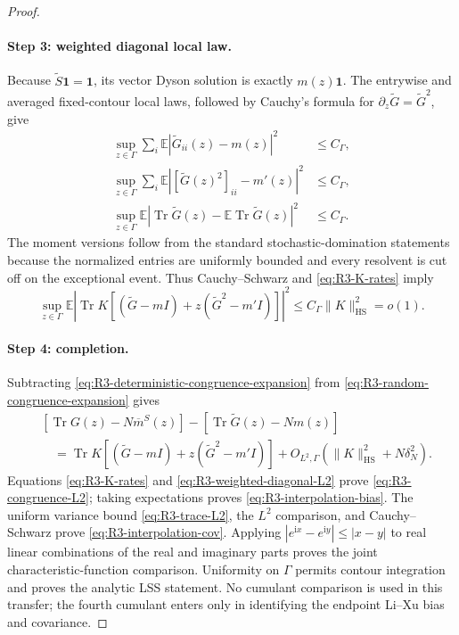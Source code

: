 \documentclass[11pt]{article}
\theoremstyle{definition}
\theoremstyle{remark}
\newcommand{\E}{\mathbb E}
\newcommand{\Tr}{\operatorname{Tr}}
\newcommand{\ii}{\mathrm i}
\newcommand{\HS}{\mathrm{HS}}
\newcommand{\one}{\mathbf 1}
\newcommand{\norm}[1]{\lVert #1\rVert}
\begin{document}
\begin{proof}
\paragraph{Step 3: weighted diagonal local law.}
Because \(\widetilde S\one=\one\), its vector Dyson solution is exactly
\(m(z)\one\).  The entrywise and averaged fixed-contour local laws, followed
by Cauchy's formula for \(\partial_z\widetilde G=\widetilde G^2\), give
\begin{align}
 \sup_{z\in\Gamma}\sum_i
 \E|\widetilde G_{ii}(z)-m(z)|^2&\le C_\Gamma,
 \label{eq:R3-diagonal-L2-G}\\
 \sup_{z\in\Gamma}\sum_i
 \E|[\widetilde G(z)^2]_{ii}-m'(z)|^2&\le C_\Gamma,
 \label{eq:R3-diagonal-L2-G2}\\
 \sup_{z\in\Gamma}\E|\Tr\widetilde G(z)
 -\E\Tr\widetilde G(z)|^2&\le C_\Gamma.
 \label{eq:R3-trace-L2}
\end{align}
The moment versions follow from the standard stochastic-domination statements
because the normalized entries are uniformly bounded and every resolvent is
cut off on the exceptional event.  Thus Cauchy--Schwarz and
\eqref{eq:R3-K-rates} imply
\begin{equation}\label{eq:R3-weighted-diagonal-L2}
 \sup_{z\in\Gamma}\E\left|
 \Tr K\left[(\widetilde G-mI)
 +z(\widetilde G^2-m'I)\right]\right|^2
 \le C_\Gamma\norm{K}_{\HS}^2=o(1).
\end{equation}

\paragraph{Step 4: completion.}
Subtracting \eqref{eq:R3-deterministic-congruence-expansion} from
\eqref{eq:R3-random-congruence-expansion} gives
\begin{align}
 &\left[\Tr G(z)-N\overline m^S(z)\right]
 -\left[\Tr\widetilde G(z)-Nm(z)\right]\nonumber\\
 &\quad=\Tr K\left[(\widetilde G-mI)
 +z(\widetilde G^2-m'I)\right]
 +O_{L^2,\Gamma}(\norm{K}_{\HS}^2+N\delta_N^2).
 \label{eq:R3-master-congruence-transfer}
\end{align}
Equations \eqref{eq:R3-K-rates} and
\eqref{eq:R3-weighted-diagonal-L2} prove
\eqref{eq:R3-congruence-L2}; taking expectations proves
\eqref{eq:R3-interpolation-bias}.  The uniform variance bound
\eqref{eq:R3-trace-L2}, the \(L^2\) comparison, and Cauchy--Schwarz prove
\eqref{eq:R3-interpolation-cov}.  Applying
$|e^{\ii x}-e^{\ii y}|\le|x-y|$ to real linear combinations of the real and
imaginary parts proves the joint characteristic-function comparison.
Uniformity on \(\Gamma\) permits contour integration and proves the analytic
LSS statement.  No cumulant comparison is used in this transfer; the fourth
cumulant enters only in identifying the endpoint Li--Xu bias and covariance.
\end{proof}
\end{document}
